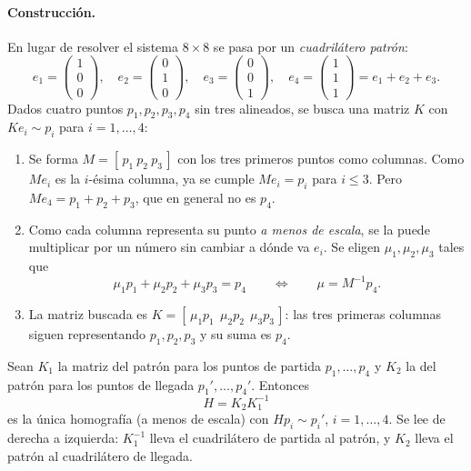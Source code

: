 \paragraph{Construcción.} En lugar de resolver el sistema \(8\times8\) se pasa por un
\emph{cuadrilátero patrón}:
\[
  e_1=\begin{pmatrix}1\\0\\0\end{pmatrix},\quad
  e_2=\begin{pmatrix}0\\1\\0\end{pmatrix},\quad
  e_3=\begin{pmatrix}0\\0\\1\end{pmatrix},\quad
  e_4=\begin{pmatrix}1\\1\\1\end{pmatrix}=e_1+e_2+e_3 .
\]
Dados cuatro puntos \(p_1,p_2,p_3,p_4\) sin tres alineados, se busca una matriz \(K\) con
\(Ke_i\sim p_i\) para \(i=1,\dots,4\):
\begin{enumerate}
  \item Se forma \(M=[\,p_1\ p_2\ p_3\,]\) con los tres primeros puntos como columnas. Como
  \(Me_i\) es la \(i\)-ésima columna, ya se cumple \(Me_i=p_i\) para \(i\le3\). Pero
  \(Me_4=p_1+p_2+p_3\), que en general no es \(p_4\).
  \item Como cada columna representa su punto \emph{a menos de escala}, se la puede
  multiplicar por un número sin cambiar a dónde va \(e_i\). Se eligen \(\mu_1,\mu_2,
  \mu_3\) tales que
  \[
    \mu_1p_1+\mu_2p_2+\mu_3p_3=p_4
    \qquad\Longleftrightarrow\qquad
    \mu=M^{-1}p_4 .
  \]
  \item La matriz buscada es \(K=[\,\mu_1p_1\ \ \mu_2p_2\ \ \mu_3p_3\,]\):
  las tres primeras columnas siguen representando \(p_1,p_2,p_3\) y su suma es \(p_4\).
\end{enumerate}

\begin{resultado}
Sean \(K_1\) la matriz del patrón para los puntos de partida \(p_1,\dots,p_4\) y \(K_2\) la
del patrón para los puntos de llegada \(p_1',\dots,p_4'\). Entonces
\[
  \boxed{H=K_2K_1^{-1}}
\]
es la única homografía (a menos de escala) con \(Hp_i\sim p_i'\), \(i=1,\dots,4\).
Se lee de derecha a izquierda: \(K_1^{-1}\) lleva el cuadrilátero de partida al patrón, y
\(K_2\) lleva el patrón al cuadrilátero de llegada.
\end{resultado}

